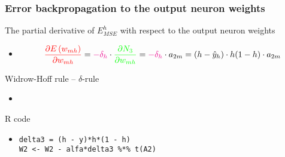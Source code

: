 \documentclass[proffesionalfonts]{beamer}
\begin{document}
\begin{frame}[fragile]
\frametitle{Error backpropagation to the output neuron weights}
\begin{block}{The partial derivative of $E_{MSE}^h$ with respect to the output neuron weights}
\begin{itemize}
\item[\ ]
\[ \textcolor{red}{\frac{\partial E \left( w_{mh} \right) }{ \partial w_{mh} }} = \textcolor{magenta}{- \delta_h} \cdot \textcolor{green}{\frac{ \partial N_3 }{ \partial w_{mh} }} = \textcolor{magenta}{- \delta_h} \cdot a_{2m} = \left( h - \hat{y}_h\right)\cdot h(1 - h) \cdot a_{2m}  \]
\end{itemize}
\end{block}
\begin{block}{Widrow-Hoff rule -- $\delta$-rule}
\begin{itemize}
\item[\ ]
 \quad {}
\end{itemize}
\end{block}
\begin{block}{R code}
\begin{itemize}
\item[\ ]
\begin{verbatim}
delta3 = (h - y)*h*(1 - h)
W2 <- W2 - alfa*delta3 %*% t(A2)
\end{verbatim}
\end{itemize}
\end{block}
\end{frame}
\end{document}

